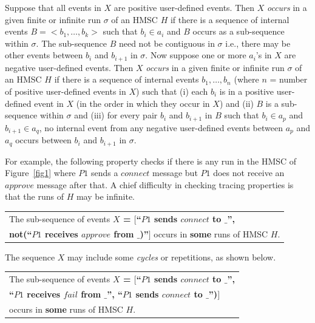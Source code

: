 \documentclass{entcs}
\begin{document}
Suppose that all events in $X$ are positive user-defined 
events. Then $X$ {\em {occurs}} in a given finite or infinite 
run $\sigma$ of an HMSC $H$ if there is a sequence of 
internal events $B = <b_1,\ldots,b_k>$ such that $b_i \in a_i$ 
and $B$ occurs as a sub-sequence within $\sigma$. 
The sub-sequence $B$ need not be contiguous in $\sigma$ 
i.e., there may be other events between $b_i$ and $b_{i+1}$ 
in $\sigma$. Now suppose one or more $a_i$'s in $X$ are 
negative user-defined events. Then $X$ {\em {occurs}} in a given 
finite or infinite run $\sigma$ of an HMSC $H$ if there 
is a sequence of internal events $b_1,\ldots,b_n$ (where 
$n$ = number of positive user-defined events in $X$) 
such that (i) each $b_i$ is in a positive user-defined 
event in $X$ (in the order in which they occur in $X$) 
and (ii) $B$ is a sub-sequence within $\sigma$ and 
(iii) for every pair $b_i$ and $b_{i+1}$ in $B$ such that 
$b_i \in a_p$ and $b_{i+1} \in a_q$, no internal event 
from any negative user-defined events between $a_p$ 
and $a_q$ occurs between $b_i$ and $b_{i+1}$ in $\sigma$.

For example, the following property checks if there is 
any run in the HMSC of Figure~\ref{fig1} where $P1$ sends a $connect$
message but $P1$ does not receive an $approve$ message after 
that. A chief difficulty in checking tracing properties 
is that the runs of $H$ may be infinite.

\begin{tabular}{|l|}
\hline
The sub-sequence of events {\bf $X$ = $[$``$P1$ sends $connect$ to $\_$'',} \\
{\bf not(``$P1$ receives $approve$ from $\_$)''$]$} occurs in {\bf some} runs 
of HMSC {\bf $H$}. \\
\hline
\end{tabular}

The sequence $X$ may include some {\em {cycles}} or 
repetitions, as shown below.

\begin{tabular}{|l|}
\hline
The sub-sequence of events {\bf $X$ = $[$``$P1$ sends $connect$ to $\_$'',} \\
{\bf ``$P1$ receives $fail$ from $\_$'', ``$P1$ sends $connect$ to $\_$'')$]$} \\
occurs in {\bf some} runs of HMSC {\bf $H$}. \\
\hline
\end{tabular}
\end{document}
